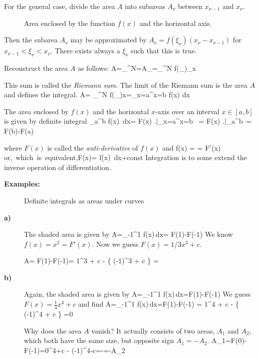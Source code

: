 For the general case, divide the area $A$ into subareas
$A_{\nu}$ between $x_{\nu-1}$ and $x_{\nu}$. \vs
\begin{figure}[!h]
    \centerline{\epsfxsize=12cm  }
    \caption{Area enclosed by the function $f(x)$ and the horizontal axis.} \label{fig23}
\end{figure} \vs

Then the subarea $A_{\nu}$ may be approximated by
$A_{\nu}=f(\xi_{\nu}) ( x_{\nu}-x_{\nu-1} )$ for $x_{\nu-1}<\xi_{\nu}<x_{\nu}$.
There exists always a $\xi_{\nu}$ such that this is true.

Reconstruct the area $A$ as follows:
\bnn
A=\sum_{}^N=A_{\nu}=\sum_{}^N f(\xi_{\nu})_{\Delta x}
\enn

This sum is called the {\em Riemann sum}. The limit of the Riemann sum is the area $A$ and defines the integral.
\bnn
A= \sum_{}^N f(\xi_{\nu})\Delta x=\int_{x=a}^{x=b} \: f(x)\: dx
\enn

The area enclosed by $f(x)$ and the horizontal $x$-axis over an interval $x \in [a,b]$ is given by
definite integral
\bnn 
\int_a^b \: f(x)\, dx= F(x)\! \left.\frac{}{}\right|_{x=a}^{x=b} \,
= F(x)\! \left.\frac{}{}\right|_a^b \,= F(b)-F(a) 
\enn

where $F(x)$ is called the {\em anti-derivative} of $f(x)$ and
\bnn f(x) =  = F'(x) \qquad\mbox{or, which is equivalent,}\qquad F(x)=\int \: f(x)\, dx+\mbox{const} \enn
Integration is to some extend the inverse operation of differentiation. \vs

{\bf Examples:}

\svs\begin{figure}[!h]
    \centering
    \hspace*{0.5cm}
     \svs
    \caption{Definite integrals as areas under curves}  \label{fig24}
\end{figure} \svs

\begin{description}
\item[{\bf a)}]
The shaded area is given by
\bnn A=\int_{-1}^1 f(x)\,dx= F(1)-F(-1) \enn
We know $f(x)=x^2=F'(x)$. Now we guess $F(x)=1/3x^3+c$.

\bnn A= F(1)-F(-1)= 1^3 + c - \{  (-1)^3 + c \} =  \enn \vs

\item[{\bf b)}]
Again, the shaded area is given by
\bnn A=\int_{-1}^1 f(x)\,dx=F(1)-F(-1)\enn
We guess $F(x)=\frac{1}{4}x^4+c$ and find
\bnn A=\int_{-1}^1 f(x)\,dx=F(1)-F(-1) = 1^4 + c - \{  (-1)^4 + c \} =0 \enn

Why does the area $A$ vanish? It actually consists of two areas, $A_1$ and $A_2$, which both have
the same size, but opposite sign $A_1=-A_2$.
\bnn A_1=F(0)-F(-1)=0^4+c - (-1)^4-c=-=-A_2 \enn
\end{description}


